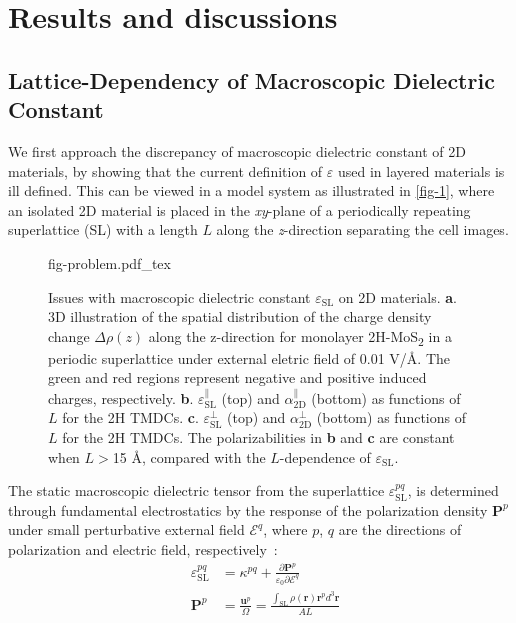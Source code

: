 
\section{Results and discussions}
\label{sec:diel-results-discussions}

\subsection{Lattice-Dependency of Macroscopic Dielectric Constant}
\label{sec:diel-latt-depend-macr}

We first approach the discrepancy of macroscopic dielectric constant
of 2D materials, by showing that the current definition of
$\varepsilon$ used in layered materials is ill defined.  This can be
viewed in a model system as illustrated
in  \autoref{fig-1}, where an isolated 2D material is placed in
the \textit{xy}-plane of a periodically repeating superlattice (SL)
with a length $L$ along the \textit{z}-direction separating the cell
images.%
\begin{figure}[!htbp]
\centering
{fig-problem.pdf_tex}
\caption{\label{fig-1} %
  Issues with macroscopic dielectric constant
  $\varepsilon_{\mathrm{SL}}$ on 2D materials.  \textbf{a}. 3D
  illustration of the spatial distribution of the charge density
  change $\Delta \rho(z)$ along the z-direction for monolayer
  2H-MoS\textsubscript{2} in a periodic superlattice under external
  eletric field of 0.01 V/\AA{}.  The green and red regions represent
  negative and positive induced charges, respectively.
  \textbf{b}.  $\varepsilon^{\parallel}_{\mathrm{SL}}$ (top) and
  $\alpha_{\mathrm{2D}}^{\parallel}$ (bottom) as functions of $L$ for
  the 2H TMDCs. \textbf{c}.  $\varepsilon^{\perp}_{\mathrm{SL}}$ (top)
  and $\alpha_{\mathrm{2D}}^{\perp}$ (bottom) as functions of $L$ for
  the 2H TMDCs. The polarizabilities in \textbf{b} and \textbf{c} are
  constant when $L>$15 \AA{}, compared with the $L$-dependence of
  $\varepsilon_{\mathrm{SL}}$. }
\end{figure}
%
The static macroscopic dielectric tensor from the superlattice
$\varepsilon_{\mathrm{SL}}^{pq}$, is determined through fundamental
electrostatics by the response of the polarization density
$\symbf{P}^{p}$ under small perturbative external field
$\mathscr{E}^{q}$, where $p$, $q$ are the directions of
polarization and electric field,
respectively~\cite{Dressel_2001_electrodynamics}:
\begin{subequations}
  \begin{eqnarray}
      \label{eq:diele-def-eps-1}
    &\varepsilon_{\mathrm{SL}}^{pq} &= \kappa^{pq} +
                                 {\displaystyle \frac{\partial \symbf{P}^{p}}
                                 {\varepsilon_{0} \partial \mathscr{E}^{q}}} \\
          \label{eq:diele-def-eps-2}
    &\symbf{P}^{p} &=  {\displaystyle \frac{\symbf{u}^{p}}{\Omega}}
                          = {\displaystyle \frac{{\displaystyle
          \int_{\mathrm{SL}} \rho(\symbf{r}) \symbf{r}^{p} d^{3}\symbf{r}}}
                          {AL}}
  \end{eqnarray}
\end{subequations}
